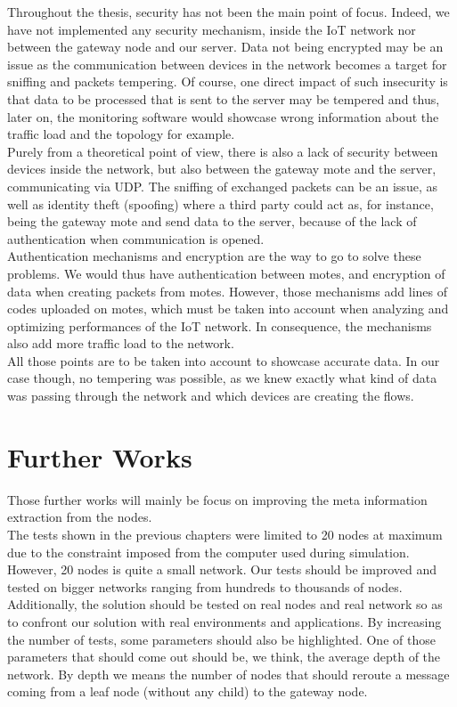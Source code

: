 Throughout the thesis, security has not been the main point of focus. Indeed, we have not implemented any security mechanism, inside the IoT network nor between the gateway node and our server. Data not being encrypted may be an issue as the communication between devices in the network becomes a target for sniffing and packets tempering. Of course, one direct impact of such insecurity is that data to be processed that is sent to the server may be tempered and thus, later on, the monitoring software would showcase wrong information about the traffic load and the topology for example.\\

Purely from a theoretical point of view, there is also a lack of security between devices inside the network, but also between the gateway mote and the server, communicating via UDP. The sniffing of exchanged packets can be an issue, as well as identity theft (spoofing) where a third party could act as, for instance, being the gateway mote and send data to the server, because of the lack of authentication when communication is opened. \\

Authentication mechanisms and encryption are the way to go to solve these problems. We would thus have authentication between motes, and encryption of data when creating packets from motes. However, those mechanisms add lines of codes uploaded on motes, which must be taken into account when analyzing and optimizing performances of the IoT network. In consequence, the mechanisms also add more traffic load to the network.\\

All those points are to be taken into account to showcase accurate data. In our case though, no tempering was possible, as we knew exactly what kind of data was passing through the network and which devices are creating the flows.

\section{Further Works}

Those further works will mainly be focus on improving the meta information extraction from the nodes.\\

The tests shown in the previous chapters were limited to 20 nodes at maximum due to the constraint imposed from the computer used during simulation. However, 20 nodes is quite a small network. Our tests should be improved and tested on bigger networks ranging from hundreds to thousands of nodes. Additionally, the solution should be tested on real nodes and real network so as to confront our solution with real environments and applications. By increasing the number of tests, some parameters should also be highlighted. One of those parameters that should come out should be, we think, the average depth of the network. By depth we means the number of nodes that should reroute a message coming from a leaf node (without any child) to the gateway node.\\

